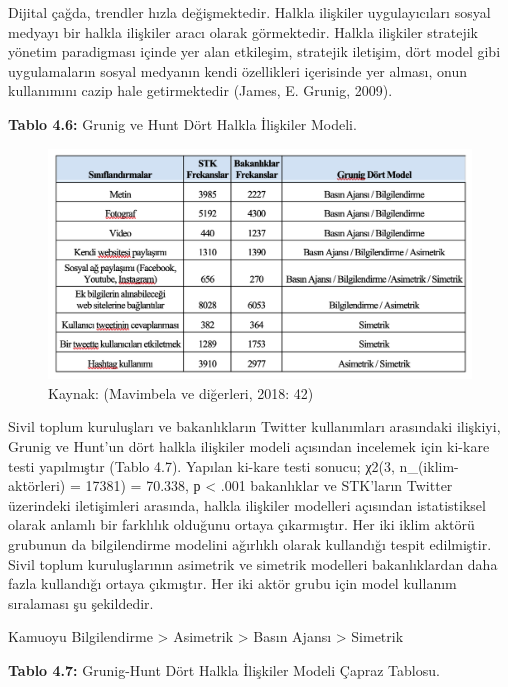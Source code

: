\documentclass[
]{book}
\begin{document}
Dijital çağda, trendler hızla değişmektedir. Halkla ilişkiler uygulayıcıları sosyal medyayı bir halkla ilişkiler aracı olarak görmektedir. Halkla ilişkiler stratejik yönetim paradigması içinde yer alan etkileşim, stratejik iletişim, dört model gibi uygulamaların sosyal medyanın kendi özellikleri içerisinde yer alması, onun kullanımını cazip hale getirmektedir (James, E. Grunig, 2009).

\textbf{Tablo 4.6:} Grunig ve Hunt Dört Halkla İlişkiler Modeli.

\begin{figure}
\includegraphics[width=0.95\linewidth,height=0.95\textheight]{tablolar-sekiller/tablo-4-6} \caption{Kaynak: (Mavimbela ve diğerleri, 2018: 42)}\label{fig:unnamed-chunk-10}
\end{figure}

Sivil toplum kuruluşları ve bakanlıkların Twitter kullanımları arasındaki ilişkiyi, Grunig ve Hunt'un dört halkla ilişkiler modeli açısından incelemek için ki-kare testi yapılmıştır (Tablo 4.7). Yapılan ki-kare testi sonucu; χ2(3, n\_(iklim-aktörleri) = 17381) = 70.338, р \textless{} .001 bakanlıklar ve STK'ların Twitter üzerindeki iletişimleri arasında, halkla ilişkiler modelleri açısından istatistiksel olarak anlamlı bir farklılık olduğunu ortaya çıkarmıştır. Her iki iklim aktörü grubunun da bilgilendirme modelini ağırlıklı olarak kullandığı tespit edilmiştir. Sivil toplum kuruluşlarının asimetrik ve simetrik modelleri bakanlıklardan daha fazla kullandığı ortaya çıkmıştır. Her iki aktör grubu için model kullanım sıralaması şu şekildedir.

Kamuoyu Bilgilendirme \textgreater{} Asimetrik \textgreater{} Basın Ajansı \textgreater{} Simetrik

\textbf{Tablo 4.7:} Grunig-Hunt Dört Halkla İlişkiler Modeli Çapraz Tablosu.
\end{document}
